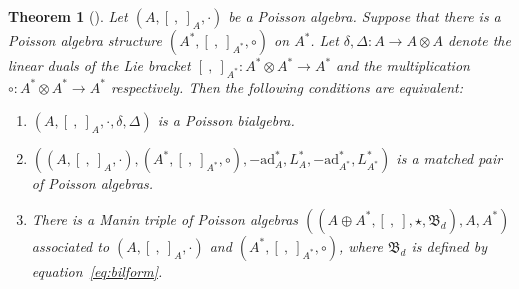 \documentclass[pdftex]{sigma}
\numberwithin{equation}{section}
\newtheorem{Theorem}{Theorem}[section]
\newcommand{\ad}{\mathrm{ad}}
\begin{document}
\begin{Theorem}[{\cite[structure Theorem~(II)]{ni2013poisson}}]\label{thm:poibieq}
 Let $(A, [\ ,\ ]_A, \cdot)$ be a Poisson algebra.
 Suppose that there is a Poisson algebra structure $(A^*, [\ ,\ ]_{A^*}, \circ)$ on $A^*$.
 Let $\delta, \Delta\colon A \to A \otimes A$ denote the linear duals of the Lie bracket $[\ ,\ ]_{A^*}\colon A^* \otimes A^* \to A^*$ and the multiplication $\circ\colon A^* \otimes A^* \to A^*$ respectively.
 Then the following conditions are equivalent:
 \begin{enumerate}\itemsep=0pt
 \item[$(1)$] $(A, [\ ,\ ]_A, \cdot, \delta, \Delta)$ is a Poisson bialgebra.
 \item[$(2)$] $((A, [\ ,\ ]_A, \cdot), (A^*, [\ ,\ ]_{A^*}, \circ), -\ad_{A}^*, L_{A}^*, -\ad_{A^*}^*, L_{A^*}^*)$ is a matched pair of Poisson algebras.
 \item[$(3)$] There is a Manin triple of Poisson algebras $((A \oplus A^*, [\ ,\ ], \star, \mathfrak{B}_d), A, A^*)$ associated to $(A, [\ ,\ ]_A, \cdot)$ and $(A^*, [\ ,\ ]_{A^*}, \circ)$, where $\mathfrak{B}_d$ is defined by equation~\eqref{eq:bilform}.
 \end{enumerate}
\end{Theorem}
\end{document}
